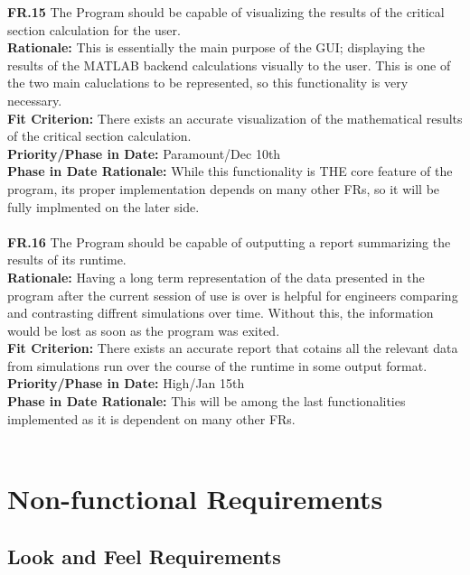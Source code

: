 \documentclass[12pt]{article}
\begin{document}
  \noindent\textbf{FR.15} The Program should be capable of visualizing the results of the critical section calculation for the user.\\
  \textbf{Rationale:} This is essentially the main purpose of the GUI; displaying the results of the MATLAB backend calculations visually to the user. This is one of the two
  main caluclations to be represented, so this functionality is very necessary.\\
  \textbf{Fit Criterion:} There exists an accurate visualization of the mathematical results of the critical section calculation.\\
  \textbf{Priority/Phase in Date:} Paramount/Dec 10th\\
  \textbf{Phase in Date Rationale:} While this functionality is THE core feature of the program, its proper implementation depends on many other FRs, so it will be fully implmented on the later side.\\\\

  \noindent\textbf{FR.16} The Program should be capable of outputting a report summarizing the results of its runtime.\\
  \textbf{Rationale:} Having a long term representation of the data presented in the program after the current session of use is over is helpful for engineers comparing
  and contrasting diffrent simulations over time. Without this, the information would be lost as soon as the program was exited.\\
  \textbf{Fit Criterion:} There exists an accurate report that cotains all the relevant data from simulations run over the course of the runtime in some output format.\\
  \textbf{Priority/Phase in Date:} High/Jan 15th\\
  \textbf{Phase in Date Rationale:} This will be among the last functionalities implemented as it is dependent on many other FRs.\\\\


\section{Non-functional Requirements}

\subsection{Look and Feel Requirements}
\end{document}
